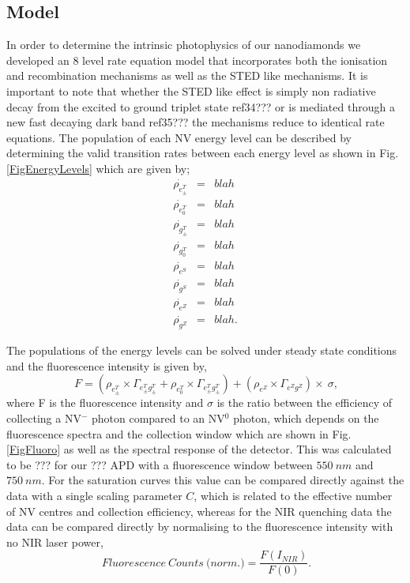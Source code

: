 \documentclass[prl]{revtex4}
\begin{document}
\subsection{Model}
In order to determine the intrinsic photophysics of our nanodiamonds we developed an 8 level rate equation model that incorporates both the ionisation and recombination mechanisms as well as the STED like mechanisms. It is important to note that whether the STED like effect is simply non radiative decay from the excited to ground triplet state ref34??? or is mediated through a new fast decaying dark band ref35??? the mechanisms reduce to identical rate equations. The population of each NV energy level can be described by determining the valid transition rates between each energy level as shown in Fig. \ref{FigEnergyLevels} which are given by;
\begin{eqnarray}
\dot{\rho_{e^{T}_\pm}} & = & blah\\ 
\dot{\rho_{e^{T}_0}} & = & blah\\
\dot{\rho_{g^{T}_\pm}} & = & blah\\ 
\dot{\rho_{g^{T}_0}} & = & blah\\
\dot{\rho_{e^S}} & = & blah\\ 
\dot{\rho_{g^S}} & = & blah\\ 
\dot{\rho_{e^Z}} & = & blah\\ 
\dot{\rho_{g^Z}} & = & blah.
\label{EqnArray}
\end{eqnarray}

The populations of the energy levels can be solved under steady state conditions and the fluorescence intensity is given by,
\begin{equation}
\SI{}{F} = \left(\rho_{e^{T}_\pm}\times\Gamma_{e^T_{\pm}g^T_{\pm}} +\rho_{e^{T}_0}\times\Gamma_{e^T_{\pm}g^T_{\pm}}\right)+\left(\rho_{e^Z}\times\Gamma_{e^Zg^Z}\right)\times\SI{}{\sigma},
\label{EqnFluoro}
\end{equation}
where F is the fluorescence intensity and $\sigma$ is the ratio between the efficiency of collecting a NV$^-$ photon compared to an NV$^0$ photon, which depends on the fluorescence spectra and the collection window which are shown in Fig. \ref{FigFluoro} as well as the spectral response of the detector. This was calculated to be ??? for our ??? APD with a fluorescence window between $\SI{550}{nm}$ and $\SI{750}{nm}$. For the saturation curves this value can be compared directly against the data with a single scaling parameter $C$, which is related to the effective number of NV centres and collection efficiency, whereas for the NIR quenching data the data can be compared directly by normalising to the fluorescence intensity with no NIR laser power,
\begin{equation}
\SI{}{Fluorescence\ Counts\ (norm}.) = \frac{F(I_{NIR})}{F(0)}.
\label{EqnFluoroCounts}
\end{equation}
\end{document}
